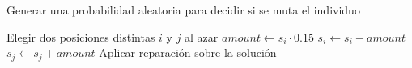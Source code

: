 \begin{algorithm}[H]
\SetAlgoLined
{}

Generar una probabilidad aleatoria para decidir si se muta el individuo\;

Elegir dos posiciones distintas $i$ y $j$ al azar\;
$amount \leftarrow s_i \cdot 0.15$\;
$s_i \leftarrow s_i - amount$\;
$s_j \leftarrow s_j + amount$\;
Aplicar reparación sobre la solución\;
\caption{Mutación por transferencia}
\end{algorithm}